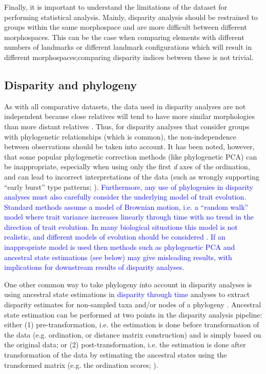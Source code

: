 \documentclass[12pt,letterpaper]{article}
\begin{document}
Finally, it is important to understand the limitations of the dataset for performing statistical analysis.
Mainly, disparity analysis should be restrained to groups within the same morphospace and are more difficult between different morphospaces.
This can be the case when comparing elements with different numbers of landmarks or different landmark configurations which will result in different morphospaces;comparing disparity indices between these is not trivial.

\subsection{Disparity and phylogeny} \label{section:phylo}

As with all comparative datasets, the data used in disparity analyses are not independent because close relatives will tend to have more similar morphologies than more distant relatives \citep{Harvey1998}.
Thus, for disparity analyses that consider groups with phylogenetic relationships (which is common), the non-independence between observations should be taken into account.
It has been noted, however, that some popular phylogenetic correction methods (like phylogenetic PCA) can be inappropriate, especially when using only the first \textit{d} axes of the ordination, and can lead to incorrect interpretations of the data (such as wrongly supporting ``early burst'' type patterns; \citealt{Uyeda2015}).
\textcolor{blue}{Furthermore, any use of phylogenies in disparity analyses must also carefully consider the underlying model of trait evolution. Standard methods assume a model of Brownian motion, i.e. a ``random walk'' model where trait variance increases linearly through time with no trend in the direction of trait evolution. In many biological situations this model is not realistic, and different models of evolution should be considered \citealt{blomberg2020}. If an inappropriate model is used then methods such as phylogenetic PCA and ancestral state estimations (see below) may give misleading results, with implications for downstream results of disparity analyses.} 

One other common way to take phylogeny into account in disparity analyses is using ancestral state estimations in \textcolor{blue}{disparity through time} analyses to extract disparity estimates for non-sampled taxa and/or nodes of a phylogeny \citep{brusatte2011phylogenetic,Guillerme2018}.
Ancestral state estimation can be performed at two points in the disparity analysis pipeline: either (1) pre-transformation, i.e. the estimation is done before transformation of the data (e.g. ordination, or distance matrix construction) and is simply based on the original data; or (2) post-transformation, i.e. the estimation is done after transformation of the data by estimating the ancestral states using the transformed matrix (e.g. the ordination scores; \citealt{lloyd2018}).
\end{document}
